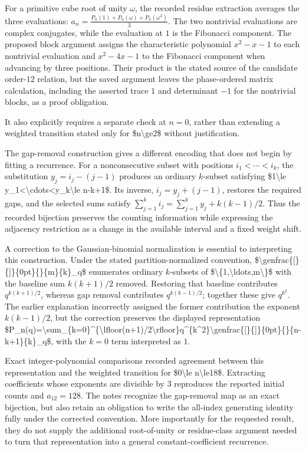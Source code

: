\documentclass[11pt]{article}
\begin{document}
For a primitive cube root of unity $\omega$, the recorded residue extraction averages the three evaluations:
$a_n=\frac{P_n(1)+P_n(\omega)+P_n(\omega^2)}{3}$. The two nontrivial evaluations are complex conjugates, while the evaluation at $1$ is the Fibonacci component. The proposed block argument assigns the characteristic polynomial $x^2-x-1$ to each nontrivial evaluation and $x^2-4x-1$ to the Fibonacci component when advancing by three positions. Their product is the stated source of the candidate order-$12$ relation, but the saved argument leaves the phase-ordered matrix calculation, including the asserted trace $1$ and determinant $-1$ for the nontrivial blocks, as a proof obligation.

It also explicitly requires a separate check at $n=0$, rather than extending a weighted transition stated only for \$n\textbackslash{}ge2\$ without justification.

The gap-removal construction gives a different encoding that does not begin by fitting a recurrence. For a nonconsecutive subset with positions $i_1<\cdots<i_k$, the substitution $y_j=i_j-(j-1)$ produces an ordinary $k$-subset satisfying \$1\textbackslash{}le y\_1\textless{}\textbackslash{}cdots\textless{}y\_k\textbackslash{}le n-k+1\$. Its inverse, $i_j=y_j+(j-1)$, restores the required gaps, and the selected sums satisfy $\sum_{j=1}^k i_j=\sum_{j=1}^k y_j+k(k-1)/2$. Thus the recorded bijection preserves the counting information while expressing the adjacency restriction as a change in the available interval and a fixed weight shift.

A correction to the Gaussian-binomial normalization is essential to interpreting this construction. Under the stated partition-normalized convention, \$\textbackslash{}genfrac\{[\}\{]\}\{0pt\}\{\}\{m\}\{k\}\_q\$ enumerates ordinary $k$-subsets of \$\textbackslash{}\{1,\textbackslash{}ldots,m\textbackslash{}\}\$ with the baseline sum $k(k+1)/2$ removed. Restoring that baseline contributes $q^{k(k+1)/2}$, whereas gap removal contributes $q^{k(k-1)/2}$; together these give $q^{k^2}$. The earlier explanation incorrectly assigned the former contribution the exponent $k(k-1)/2$, but the correction preserves the displayed representation
\$P\_n(q)=\textbackslash{}sum\_\{k=0\}\textasciicircum{}\{\textbackslash{}lfloor(n+1)/2\textbackslash{}rfloor\}q\textasciicircum{}\{k\textasciicircum{}2\}\textbackslash{}genfrac\{[\}\{]\}\{0pt\}\{\}\{n-k+1\}\{k\}\_q\$,
with the $k=0$ term interpreted as $1$.

Exact integer-polynomial comparisons recorded agreement between this representation and the weighted transition for \$0\textbackslash{}le n\textbackslash{}le18\$. Extracting coefficients whose exponents are divisible by $3$ reproduces the reported initial counts and $a_{12}=128$. The notes recognize the gap-removal map as an exact bijection, but also retain an obligation to write the all-index generating identity fully under the corrected convention. More importantly for the requested result, they do not supply the additional root-of-unity or residue-class argument needed to turn that representation into a general constant-coefficient recurrence.
\end{document}
